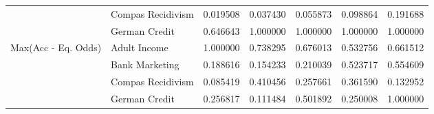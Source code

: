 \begin{tabular}{llrrrrr}
 & Compas Recidivism & 0.019508 & 0.037430 & 0.055873 & 0.098864 & 0.191688 \\
 & German Credit & 0.646643 & 1.000000 & 1.000000 & 1.000000 & 1.000000 \\
\cline{1-7}
\multirow[t]{4}{*}{Max(Acc - Eq. Odds)} & Adult Income & 1.000000 & 0.738295 & 0.676013 & 0.532756 & 0.661512 \\
 & Bank Marketing & 0.188616 & 0.154233 & 0.210039 & 0.523717 & 0.554609 \\
 & Compas Recidivism & 0.085419 & 0.410456 & 0.257661 & 0.361590 & 0.132952 \\
 & German Credit & 0.256817 & 0.111484 & 0.501892 & 0.250008 & 1.000000 \\
\cline{1-7}
\bottomrule
\end{tabular}
